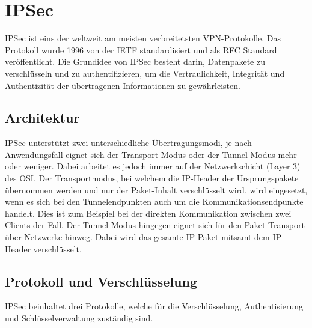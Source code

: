 \section{\acrfull{IPSec}} \label{ipsec}

\acrfull{IPSec} ist eins der weltweit am meisten verbreitetsten \gls{VPN}-Protokolle. Das Protokoll wurde 1996 von der \gls{IETF} standardisiert und als \gls{RFC} Standard veröffentlicht. Die Grundidee von \gls{IPSec} besteht darin, Datenpakete zu verschlüsseln und zu authentifizieren, um die Vertraulichkeit, Integrität und Authentizität der übertragenen Informationen zu gewährleisten. \cite{BSI_VPN_10, RFC2401}

\subsection{Architektur}
\gls{IPSec} unterstützt zwei unterschiedliche Übertragungsmodi, je nach Anwendungsfall eignet sich der Transport-Modus oder der Tunnel-Modus mehr oder weniger. Dabei arbeitet es jedoch immer auf der Netzwerkschicht (Layer 3) des \gls{OSI}. Der Transportmodus, bei welchem die \gls{IP}-Header der Ursprungspakete übernommen werden und nur der Paket-Inhalt verschlüsselt wird, wird eingesetzt, wenn es sich bei den Tunnelendpunkten auch um die Kommunikationsendpunkte handelt. Dies ist zum Beispiel bei der direkten Kommunikation zwischen zwei Clients der Fall. Der Tunnel-Modus hingegen eignet sich für den Paket-Transport über Netzwerke hinweg. Dabei wird das gesamte \gls{IP}-Paket mitsamt dem \gls{IP}-Header verschlüsselt. \cite{BSI_VPN_10, Ipsec_VPN_Design, Guide_to_IPsec_VPNs}

\subsection{Protokoll und Verschlüsselung}
\gls{IPSec} beinhaltet drei Protokolle, welche für die Verschlüsselung, Authentisierung und Schlüsselverwaltung zuständig sind.

